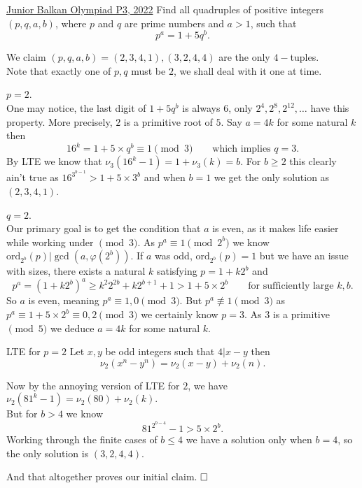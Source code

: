 \begin{problem}{1}{\href{https://artofproblemsolving.com/community/q3h2874609p34343404}{Junior Balkan Olympiad P3, 2022}}
	Find all quadruples of positive integers $(p, q, a, b)$, where $p$ and $q$ are prime numbers and $a > 1$, such that$$p^a = 1 + 5q^b.$$
	\begin{solution} We claim $(p,q,a,b)=(2,3,4,1),(3,2,4,4)$ are the only $4-$tuples.\\
	Note that exactly one of $p,q$ must be $2$, we shall deal with it one at time.
	\begin{mycases} 
		\item $p=2$.\\
One may notice, the last digit of $1+5q^b$ is always $6$, only $2^4,2^8,2^{12},\ldots$ have this property. More precisely, $2$ is a primitive root of $5$. Say $a=4k$ for some natural $k$ then
$$16^{k}=1+5\times q^b\equiv 1\pmod{3}\qquad\text{which implies $q=3$}.$$
	\indent By LTE we know that $\nu_3(16^k-1)=1+\nu_3(k)=b$. For $b\ge 2$ this clearly ain't true as $16^{3^{b-1}}>1+5\times 3^b$ and when $b=1$ we get the only solution as $(2,3,4,1)$.\\

		\item $q=2$.\\
	Our primary goal is to get the condition that $a$ is even, as it makes life easier while working under $\pmod{3}$. As $p^{a}\equiv 1\pmod{2^b}$ we know $\text{ord}_{2^b}(p)\lvert \gcd(a,\varphi(2^b))$. If $a$ was odd, $\text{ord}_{2^b}(p)=1$ but we have an issue with sizes, there exists a natural $k$ satisfying $p=1+k2^b$ and
$$p^a=(1+k2^b)^a\ge k^{2}2^{2b}+k2^{b+1}+1>1+5\times 2^b\qquad\text{for sufficiently large $k,b$.}$$So $a$ is even, meaning $p^a\equiv 1,0\pmod{3}$. But $p^a\not\equiv 1\pmod{3}$ as  $p^a\equiv 1+5\times 2^b\equiv 0,2\pmod{3}$ we certainly know $p=3$. As $3$ is a primitive $\pmod{5}$ we deduce $a=4k$ for some natural $k$.
	
	\begin{theorem}{1}{LTE for $p=2$}
		Let $x,y$ be odd integers such that $4|x-y$ then
		$$\nu_2(x^n-y^n)=\nu_2(x-y)+\nu_2(n).$$
	\end{theorem}
	
	Now by the annoying version of LTE for $2$, we have $\nu_2(81^k-1)=\nu_2(80)+\nu_2(k).$\\
	But for $b>4$ we know
$$81^{2^{b-4}}-1>5\times 2^b.$$
Working through the finite cases of $b\le 4$ we have a solution only when $b=4$, so the only solution is $(3,2,4,4)$.\\
	\end{mycases}
	
	\noindent And that altogether proves our initial claim. $\qedwhite$

	\end{solution}
\end{problem}
